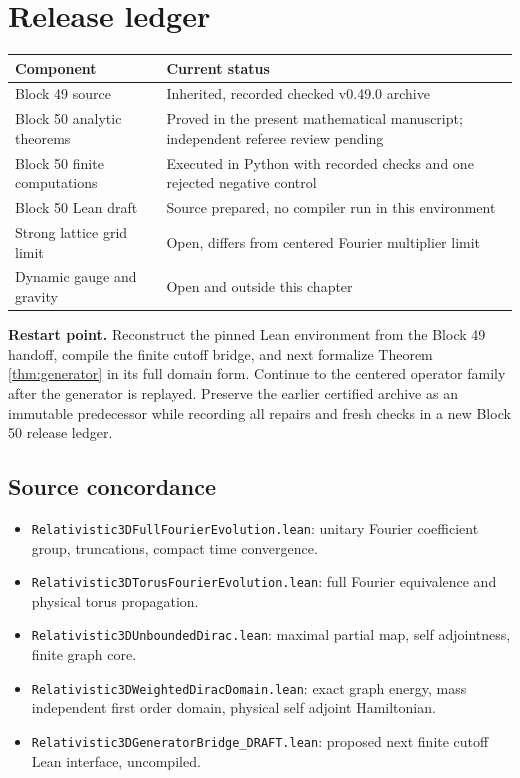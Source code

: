 \section{Release ledger}
\begin{center}
\small
\begin{tabularx}{\linewidth}{>{\raggedright\arraybackslash}p{1.6in}X}
\toprule
\textbf{Component} & \textbf{Current status}\\\midrule
Block 49 source & Inherited, recorded checked v0.49.0 archive\\
Block 50 analytic theorems & Proved in the present mathematical manuscript; independent referee review pending\\
Block 50 finite computations & Executed in Python with recorded checks and one rejected negative control\\
Block 50 Lean draft & Source prepared, no compiler run in this environment\\
Strong lattice grid limit & Open, differs from centered Fourier multiplier limit\\
Dynamic gauge and gravity & Open and outside this chapter\\
\bottomrule
\end{tabularx}
\end{center}

\textbf{Restart point.} Reconstruct the pinned Lean environment from the Block 49 handoff, compile the finite cutoff bridge, and next formalize Theorem \ref{thm:generator} in its full domain form. Continue to the centered operator family after the generator is replayed. Preserve the earlier certified archive as an immutable predecessor while recording all repairs and fresh checks in a new Block 50 release ledger.

\subsection{Source concordance}
\begin{itemize}
\item \texttt{Relativistic3DFullFourierEvolution.lean}: unitary Fourier coefficient group, truncations, compact time convergence.
\item \texttt{Relativistic3DTorusFourierEvolution.lean}: full Fourier equivalence and physical torus propagation.
\item \texttt{Relativistic3DUnboundedDirac.lean}: maximal partial map, self adjointness, finite graph core.
\item \texttt{Relativistic3DWeightedDiracDomain.lean}: exact graph energy, mass independent first order domain, physical self adjoint Hamiltonian.
\item \texttt{Relativistic3DGeneratorBridge\_DRAFT.lean}: proposed next finite cutoff Lean interface, uncompiled.
\end{itemize}

